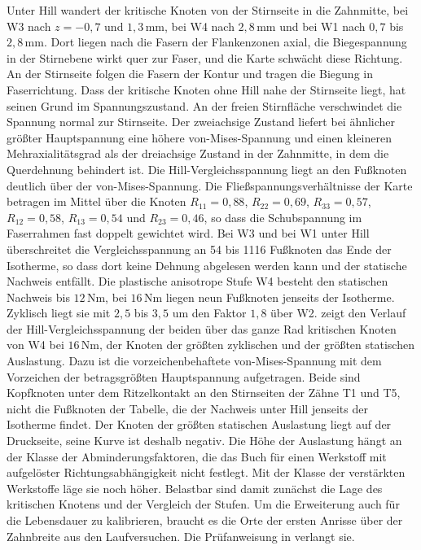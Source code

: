 Unter Hill wandert der kritische Knoten von der Stirnseite in die Zahnmitte, bei W3 nach $z = -0{,}7$ und $1{,}3$\,mm, bei W4 nach $2{,}8$\,mm und bei W1 nach $0{,}7$ bis $2{,}8$\,mm. Dort liegen nach  die Fasern der Flankenzonen axial, die Biegespannung in der Stirnebene wirkt quer zur Faser, und die Karte schwächt diese Richtung. An der Stirnseite folgen die Fasern der Kontur und tragen die Biegung in Faserrichtung. Dass der kritische Knoten ohne Hill nahe der Stirnseite liegt, hat seinen Grund im Spannungszustand. An der freien Stirnfläche verschwindet die Spannung normal zur Stirnseite. Der zweiachsige Zustand liefert bei ähnlicher größter Hauptspannung eine höhere von-Mises-Spannung und einen kleineren Mehraxialitätsgrad als der dreiachsige Zustand in der Zahnmitte, in dem die Querdehnung behindert ist. Die Hill-Vergleichs\-spannung liegt an den Fußknoten deutlich über der von-Mises-Spannung. Die Fließspannungsverhältnisse der Karte betragen im Mittel über die Knoten $R_{11} = 0{,}88$, $R_{22} = 0{,}69$, $R_{33} = 0{,}57$, $R_{12} = 0{,}58$, $R_{13} = 0{,}54$ und $R_{23} = 0{,}46$, so dass die Schubspannung im Faserrahmen fast doppelt gewichtet wird. Bei W3 und bei W1 unter Hill überschreitet die Vergleichsspannung an 54 bis 1116 Fußknoten das Ende der Isotherme, so dass dort keine Dehnung abgelesen werden kann und der statische Nachweis entfällt. Die plastische anisotrope Stufe W4 besteht den statischen Nachweis bis $12$\,Nm, bei $16$\,Nm liegen neun Fußknoten jenseits der Isotherme. Zyklisch liegt sie mit $2{,}5$ bis $3{,}5$ um den Faktor $1{,}8$ über W2.  zeigt den Verlauf der Hill-Vergleichsspannung der beiden über das ganze Rad kritischen Knoten von W4 bei $16$\,Nm, der Knoten der größten zyklischen und der größten statischen Auslastung. Dazu ist die vorzeichenbehaftete von-Mises-Spannung mit dem Vorzeichen der betragsgrößten Hauptspannung aufgetragen. Beide sind Kopfknoten unter dem Ritzelkontakt an den Stirnseiten der Zähne T1 und T5, nicht die Fußknoten der Tabelle, die der Nachweis unter Hill jenseits der Isotherme findet. Der Knoten der größten statischen Auslastung liegt auf der Druckseite, seine Kurve ist deshalb negativ. Die Höhe der Auslastung hängt an der Klasse der Abminderungsfaktoren, die das Buch für einen Werkstoff mit aufgelöster Richtungsabhängigkeit nicht festlegt. Mit der Klasse der verstärkten Werkstoffe läge sie noch höher. Belastbar sind damit zunächst die Lage des kritischen Knotens und der Vergleich der Stufen. Um die Erweiterung auch für die Lebensdauer zu kalibrieren, braucht es die Orte der ersten Anrisse über der Zahnbreite aus den Laufversuchen. Die Prüfanweisung in  verlangt sie.

